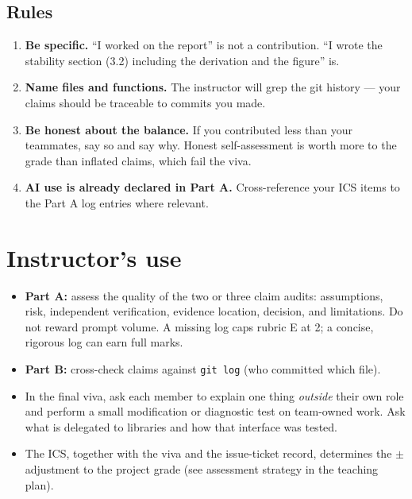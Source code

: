 \documentclass[11pt]{article}
\begin{document}
\subsection*{Rules}
\begin{enumerate}[leftmargin=2.2em, itemsep=2pt]
  \item \textbf{Be specific.} ``I worked on the report'' is not a contribution.
    ``I wrote the stability section (3.2) including the derivation and the
    figure'' is.
  \item \textbf{Name files and functions.} The instructor will grep the git
    history --- your claims should be traceable to commits you made.
  \item \textbf{Be honest about the balance.} If you contributed less than your
    teammates, say so and say why. Honest self-assessment is worth more to the
    grade than inflated claims, which fail the viva.
  \item \textbf{AI use is already declared in Part A.} Cross-reference your ICS
    items to the Part A log entries where relevant.
\end{enumerate}

\section*{Instructor's use}
\begin{itemize}[leftmargin=2em, itemsep=2pt]
  \item \textbf{Part A:} assess the quality of the two or three claim audits:
    assumptions, risk, independent verification, evidence location, decision,
    and limitations. Do not reward prompt volume. A missing log caps rubric E
    at 2; a concise, rigorous log can earn full marks.
  \item \textbf{Part B:} cross-check claims against \texttt{git log} (who
    committed which file).
  \item In the final viva, ask each member to explain one thing \emph{outside}
    their own role and perform a small modification or diagnostic test on
    team-owned work. Ask what is delegated to libraries and how that interface
    was tested.
  \item The ICS, together with the viva and the issue-ticket record,
    determines the $\pm$ adjustment to the project grade (see assessment
    strategy in the teaching plan).
\end{itemize}
\end{document}
